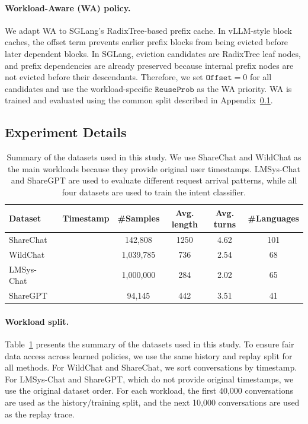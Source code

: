 \documentclass{article}
\newcommand{\cmark}{\ding{51}}
\newcommand{\xmark}{\ding{55}}
\begin{document}
\paragraph{Workload-Aware (WA) policy.} We adapt WA to SGLang's RadixTree-based prefix cache. In vLLM-style block caches, the offset term prevents earlier prefix blocks from being evicted before later dependent blocks. In SGLang, eviction candidates are RadixTree leaf nodes, and prefix dependencies are already preserved because internal prefix nodes are not evicted before their descendants. Therefore, we set \(\texttt{Offset}=0\) for all candidates and use the workload-specific \(\texttt{ReuseProb}\) as the WA priority. WA is trained and evaluated using the common split described in Appendix~\ref{app:experiment_setup}.




\subsection{Experiment Details}
\label{app:experiment_setup}


\begin{table}[t]
    \caption{Summary of the datasets used in this study. We use ShareChat and WildChat as the main workloads because they provide original user timestamps. LMSys-Chat and ShareGPT are used to evaluate different request arrival patterns, while all four datasets are used to train the intent classifier.}
  \label{tab:workloads}
  \centering
  \begin{tabular}{lccccc}
    \toprule
    Dataset & Timestamp & \#Samples & Avg. length & Avg. turns & \#Languages \\
    \midrule
    ShareChat~\cite{yan2025sharechat}       & \cmark & 142,808   & 1250 & 4.62 & 101 \\
    WildChat~\cite{zhao2024wildchat}        & \cmark & 1,039,785 & 736  & 2.54 & 68  \\
    LMSys-Chat~\cite{zheng2023lmsys}  & \xmark & 1,000,000 & 284  & 2.02 & 65  \\
    ShareGPT~\cite{sharegpt}        & \xmark & 94,145    & 442 & 3.51 & 41  \\
    \bottomrule
  \end{tabular}
\end{table}

\paragraph{Workload split.}
Table~\ref{tab:workloads} presents the summary of the datasets used in this study. To ensure fair data access across learned policies, we use the same history and replay split for all methods. For WildChat and ShareChat, we sort conversations by timestamp. For LMSys-Chat and ShareGPT, which do not provide original timestamps, we use the original dataset order. For each workload, the first 40{,}000 conversations are used as the history/training split, and the next 10{,}000 conversations are used as the replay trace.
\end{document}
